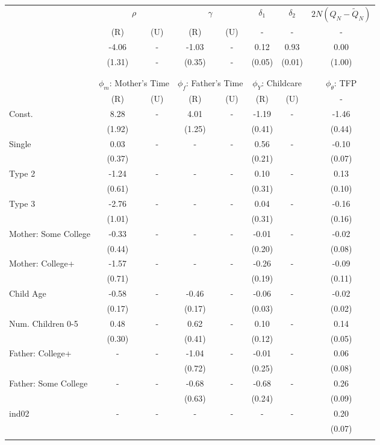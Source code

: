 \begin{tabular}{lccccccc}\toprule
 & \multicolumn{2}{c}{$\rho$} & \multicolumn{2}{c}{$\gamma$} & {$\delta_{1}$} & {$\delta_{2}$} & $2N(Q_{N} - \tilde{Q}_{N})$ \\
 & (R) & (U) & (R) & (U) & - & - & - \\\cmidrule(r){2-3}\cmidrule(r){4-5}\cmidrule(r){6-6}\cmidrule(r){7-7}\cmidrule(r){8-8}
&-4.06& - &-1.03& - &0.12&0.93&0.00\\
&(1.31)& - &(0.35)& - &(0.05)&(0.01)&(1.00)\\
\\
&&&&&&&\\
 & \multicolumn{2}{c}{$\phi_{m}$: Mother's Time} & \multicolumn{2}{c}{$\phi_{f}$: Father's Time} & \multicolumn{2}{c}{$\phi_{Y}$: Childcare} &{$\phi_{\theta}$: TFP} \\
 & (R) & (U) & (R) & (U) & (R) & (U) & -  \\\cmidrule(r){2-3}\cmidrule(r){4-5}\cmidrule(r){6-7}\cmidrule(r){8-8}
Const.&8.28& -&4.01& -&-1.19& -&-1.46\\
&(1.92)&&(1.25)&&(0.41)&&(0.44)\\
Single&0.03& -& - & -&0.56& -&-0.10\\
&(0.37)& & &&(0.21)&&(0.07)\\
Type 2&-1.24& -& - & -&0.10& -&0.13\\
&(0.61)& & &&(0.31)&&(0.10)\\
Type 3&-2.76& -& - & -&0.04& -&-0.16\\
&(1.01)& & &&(0.31)&&(0.16)\\
Mother: Some College&-0.33& -& - & -&-0.01& -&-0.02\\
&(0.44)& & &&(0.20)&&(0.08)\\
Mother: College+&-1.57& -& - & -&-0.26& -&-0.09\\
&(0.71)& & &&(0.19)&&(0.11)\\
Child Age&-0.58& -&-0.46& -&-0.06& -&-0.02\\
&(0.17)&&(0.17)&&(0.03)&&(0.02)\\
Num. Children 0-5&0.48& -&0.62& -&0.10& -&0.14\\
&(0.30)&&(0.41)&&(0.12)&&(0.05)\\
Father: College+& - & -&-1.04& -&-0.01& -&0.06\\
 & &&(0.72)&&(0.25)&&(0.08)\\
Father: Some College& - & -&-0.68& -&-0.68& -&0.26\\
 & &&(0.63)&&(0.24)&&(0.09)\\
ind02& - & -& - & -& - & -&0.20\\
 & & & & & &&(0.07)\\
\\
\bottomrule\end{tabular}